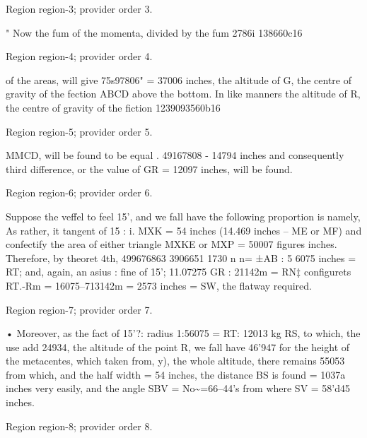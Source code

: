 \documentclass[11pt]{article}
\begin{document}
{\scriptsize\color{gray} Region region-3; provider order 3.\par}
\medskip

" Now the fum of the momenta, divided by the fum 2786i 138660c16
\par

{\scriptsize\color{gray} Region region-4; provider order 4.\par}
\medskip

of the areas, will give 75s97806" = 37006 inches, the altitude of G, the centre of gravity of the fection ABCD above the bottom. In like manners the altitude of R, the centre of gravity of the fiction 1239093560b16
\par

{\scriptsize\color{gray} Region region-5; provider order 5.\par}
\medskip

MMCD, will be found to be equal . 49167808 - 14794 inches and consequently third difference, or the value of GR = 12097 inches, will be found.
\par

{\scriptsize\color{gray} Region region-6; provider order 6.\par}
\medskip

Suppose the veffel to feel 15’, and we fall have the following proportion is namely, As rather, it tangent of 15 : i. MXK = 54 inches (14.469 inches – ME or MF) and confectify the area of either triangle MXKE or MXP = 50007 figures inches. Therefore, by theoret 4th, 499676863 3906651 1730 n n= ±AB : 5 6075 inches = RT; and, again, an asius : fine of 15’; 11.07275 GR : 21142m = RN‡ configurets RT.-Rm = 16075–713142m = 2573 inches = SW, the flatway required.
\par

{\scriptsize\color{gray} Region region-7; provider order 7.\par}
\medskip

• Moreover, as the fact of 15’?: radius 1:56075 = RT: 12013 kg RS, to which, the use add 24934, the altitude of the point R, we fall have 46'947 for the height of the metacentes, which taken from, y), the whole altitude, there remains 55053 from which, and the half width = 54 inches, the distance BS is found = 1037a inches very easily, and the angle SBV = No\textasciitilde{}=66–44’s from where SV = 58'd45 inches.
\par

{\scriptsize\color{gray} Region region-8; provider order 8.\par}
\medskip
\end{document}
